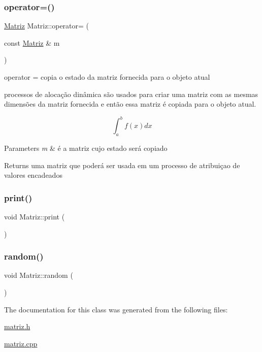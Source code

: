 \mbox{\label{class_matriz_ae31f04bcc48d4d514c025368b392a7b8}} 
\subsubsection{\texorpdfstring{operator=()}{operator=()}}
{\footnotesize\ttfamily \hyperlink{class_matriz}{Matriz} Matriz\+::operator= (\begin{DoxyParamCaption}\item[{const \hyperlink{class_matriz}{Matriz} \&}]{m }\end{DoxyParamCaption})}



operator = copia o estado da matriz fornecida para o objeto atual 

processos de alocação dinâmica são usados para criar uma matriz com as mesmas dimensões da matriz fornecida e então essa matriz é copiada para o objeto atual.

\[ \int_a^b f(x) dx \]


\begin{DoxyParams}{Parameters}
{\em m} & é a matriz cujo estado será copiado\\
\hline
\end{DoxyParams}
\begin{DoxyReturn}{Returns}
uma matriz que poderá ser usada em um processo de atribuiçao de valores encadeados 
\end{DoxyReturn}
\mbox{\label{class_matriz_af8987741da4cabe0aa054f2e8b077a97}} 
\subsubsection{\texorpdfstring{print()}{print()}}
{\footnotesize\ttfamily void Matriz\+::print (\begin{DoxyParamCaption}{ }\end{DoxyParamCaption})}

\mbox{\label{class_matriz_ae4ae38c97dcbedf305850dbce7275506}} 
\subsubsection{\texorpdfstring{random()}{random()}}
{\footnotesize\ttfamily void Matriz\+::random (\begin{DoxyParamCaption}{ }\end{DoxyParamCaption})}



The documentation for this class was generated from the following files\+:\begin{DoxyCompactItemize}
\item 
\hyperlink{matriz_8h}{matriz.\+h}\item 
\hyperlink{matriz_8cpp}{matriz.\+cpp}\end{DoxyCompactItemize}
